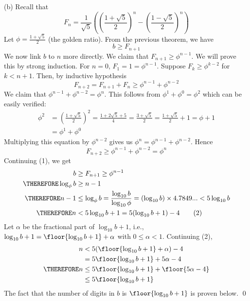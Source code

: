 (b)
Recall that
\[
F_n = \frac{1}{\sqrt{5}}
\left(
\left(\frac{1 + \sqrt{5}}{2}\right)^n
-
\left(\frac{1 - \sqrt{5}}{2}\right)^n
\right)
\]
Let $\phi = \frac{1 + \sqrt{5}}{2}$ (the golden ratio).
From the previous theorem, we have
\[
b \geq F_{n + 1} \tag{1}
\]
We now link $b$ to $n$ more directly.
We claim that $F_{n + 1} \geq \phi^{n - 1}$.
We will prove this by strong induction.
For $n = 0$, $F_1 = 1 = \phi^{n - 1}$.
Suppose $F_{k} \geq \phi^{k - 2}$ for $k < n + 1$.
Then, by inductive hypothesis
\[
F_{n + 2} = F_{n + 1} + F_{n} \geq \phi^{n-1} + \phi^{n-2}
\]
We claim that 
$\phi^{n-1} + \phi^{n-2} = \phi^n$.
This follows from $\phi^1 + \phi^0 = \phi^2$ which can be easily verified:
\begin{align*}
\phi^2
&= \left(\frac{1 + \sqrt{5}}{2}\right)^2
= \frac{1 + 2\sqrt{5} + 5}{4}
= \frac{3 + \sqrt{5}}{2}
= \frac{1 + \sqrt{5}}{2} + 1
= \phi + 1
\\
&
= \phi^1 + \phi^0
\end{align*}
Multiplying this equation by $\phi^{n-2}$ gives us
$\phi^n = \phi^{n-1} + \phi^{n-2}$.
Hence
\[
F_{n + 2} \geq \phi^{n-1} + \phi^{n-2} = \phi^n
\]
Continuing (1), we get
\begin{align*}
b &\geq F_{n+1} \geq \phi^{n-1} \\
\THEREFORE \log_{\phi} b &\geq n-1 \\
\THEREFORE n - 1 &\leq \log_{\phi} b = \frac{\log_{10} b}{\log_{10} \phi}
= (\log_{10} b)  \times 4.7849... < 5 \log_{10}b\\
\THEREFORE n &<  5 \log_{10}b + 1 = 5 (\log_{10}b + 1) - 4 \tag{2}
\end{align*}
Let $\alpha$ be the fractional part of $\log_{10}b + 1$, i.e.,
$\log_{10}b + 1 = \floor{\log_{10}b + 1} + \alpha$ with $0 \leq \alpha < 1$.
Continuing (2),
\begin{align*}
n
&< 5 (\floor{\log_{10}b + 1} + \alpha) - 4 \\
&= 5 \floor{\log_{10}b + 1} + 5\alpha - 4 \\
\THEREFORE n 
&\leq 5 \floor{\log_{10}b + 1} + \floor{5\alpha - 4} \\
&\leq 5 \floor{\log_{10}b + 1}
\end{align*}
The fact that the number of digits in $b$ is 
$\floor{\log_{10}b + 1}$ is proven below.
\qed
